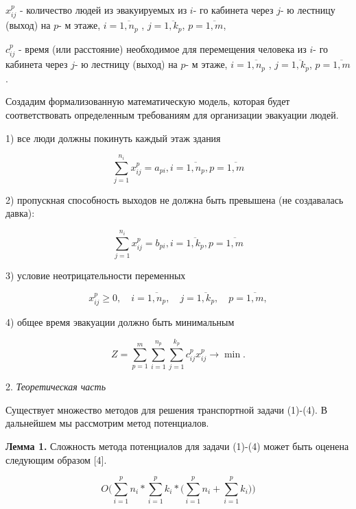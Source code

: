 \begin{multicols}{2}
\(x_{ij}^{p}\) - количество людей из эвакуируемых из \(i\)- го кабинета
через \(j\)- ю лестницу (выход) на \(p\)- м этаже,
\(i = \overline{1,n_{p}}\) , \(j = \overline{1,k_{p}}\),
\(p = \overline{1,m}\),

\(c_{ij}^{p}\) - время (или расстояние) необходимое для перемещения
человека из \(i\)- го кабинета через \(j\)- ю лестницу (выход) на \(p\)-
м этаже, \(i = \overline{1,n_{p}}\) , \(j = \overline{1,k_{p}}\),
\(p = \overline{1,m}\).

Создадим формализованную математическую модель, которая будет
соответствовать определенным требованиям для организации эвакуации
людей.

1) все люди должны покинуть каждый этаж здания

\begin{equation}
\sum_{j = 1}^{n_{i}}x_{ij}^{p} = a_{pi},i = \overline{1,n_{p}},p = \overline{1,m}
\end{equation}

2) пропускная способность выходов не должна быть превышена (не создавалась давка):

\begin{equation}
\sum_{j = 1}^{n_{i}}x_{ij}^{p} = b_{pi},i = \overline{1,k_{p}},p = \overline{1,m}
\end{equation}

3) условие неотрицательности переменных

\begin{equation}
x_{ij}^{p} \geq 0,\quad i = \overline{1,n_{p}},\quad j = \overline{1,k_{p}},\quad p = \overline{1,m},
\end{equation}

4) общее время эвакуации должно быть минимальным

\begin{equation}
Z = \sum_{p = 1}^{m}{\sum_{i = 1}^{n_{p}}{\sum_{j = 1}^{k_{p}}{c_{ij}^{p}x_{ij}^{p} \rightarrow \min}}}.
\end{equation}

2. \emph{Теоретическая часть}

Существует множество методов для решения транспортной задачи (1)-(4). В
дальнейшем мы рассмотрим метод потенциалов.

{\bfseries Лемма 1.} Сложность метода потенциалов для задачи (1)-(4) может
быть оценена следующим образом {[}4{]}.

\begin{equation}
O(\sum_{i = 1}^{p}n_{i} \ast \sum_{i = 1}^{p}k_{i} \ast (\sum_{i = 1}^{p}n_{i} + \sum_{i = 1}^{p}{k_{i}))}
\end{equation}


\end{multicols}
